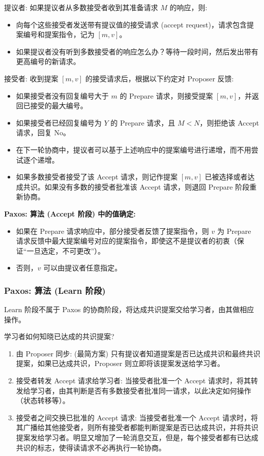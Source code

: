 提议者: 如果提议者从多数接受者收到其准备请求 $M$ 的响应，则:
\begin{itemize}
\item 向每个这些接受者发送带有提议值的接受请求 (accept request)，请求包含提案编号和提案指令，记为 $[m, v]$。
\item 如果提议者没有听到多数接受者的响应怎么办？等待一段时间，然后发出带有更高编号的新请求。
\end{itemize}

接受者: 收到提案 $[m, v]$ 的接受请求后，根据以下约定对 Proposer 反馈:
\begin{itemize}
\item 如果接受者没有回复编号大于 $m$ 的 Prepare 请求，则接受提案 $[m, v]$，并返回已接受的最大编号。
\item 如果接受者已经回复编号为 $Y$ 的 Prepare 请求，且 $M < N$，则拒绝该 Accept 请求，回复 No。
\item 在下一轮协商中，提议者可以基于上述响应中的提案编号进行递增，而不用尝试逐个递增。
\item 如果多数接受者接受了该 Accept 请求，则记作提案 $[m, v]$ 已被选择或者达成共识。如果没有多数的接受者批准该 Accept 请求，则退回 Prepare 阶段重新协商。
\end{itemize}

\textbf{Paxos: 算法 (Accept 阶段) 中的值确定:}
\begin{itemize}
\item 如果在 Prepare 请求响应中，部分接受者反馈了提案指令，则 $v$ 为 Prepare 请求反馈中最大提案编号对应的提案指令，即使这不是提议者的初衷（保证“一旦选定，不可更改”）。
\item 否则，$v$ 可以由提议者任意指定。
\end{itemize}

\subsubsection{Paxos: 算法 (Learn 阶段)}

Learn 阶段不属于 Paxos 的协商阶段，将达成共识提案交给学习者，由其做相应操作。

学习者如何知晓已达成的共识提案?
\begin{enumerate}
\item 由 Proposer 同步: (最简方案) 只有提议者知道提案是否已达成共识和最终共识提案，如果已达成共识，Proposer 则立即将该提案发送给学习者。
\item 接受者转发 Accept 请求给学习者: 当接受者批准一个 Accept 请求时，将其转发给学习者，由其判断是否有多数接受者批准同一请求，以此决定如何操作（状态转移等）。
\item 接受者之间交换已批准的 Accept 请求: 当接受者批准一个 Accept 请求时，将其广播给其他接受者，则所有接受者都能判断提案是否已达成共识，并将共识提案发给学习者。明显又增加了一轮消息交互，但是，每个接受者都有已达成共识的标志，使得读请求不必再执行一轮协商。
\end{enumerate}

